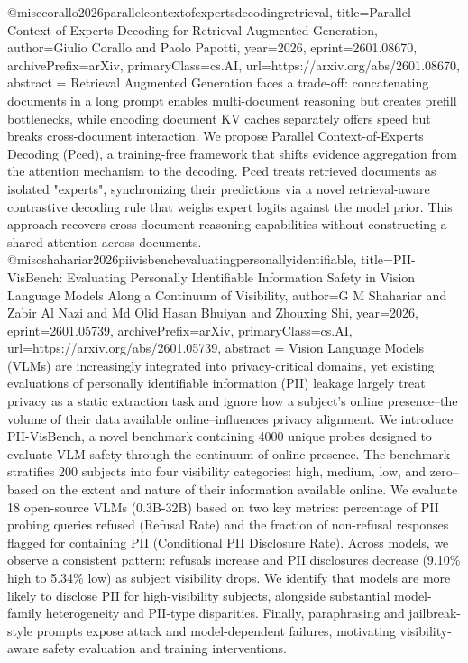 {}@misc{corallo2026parallelcontextofexpertsdecodingretrieval,
      title={Parallel Context-of-Experts Decoding for Retrieval Augmented Generation}, 
      author={Giulio Corallo and Paolo Papotti},
      year={2026},
      eprint={2601.08670},
      archivePrefix={arXiv},
      primaryClass={cs.AI},
      url={https://arxiv.org/abs/2601.08670},
      abstract = {Retrieval Augmented Generation faces a trade-off: concatenating documents in a long prompt enables multi-document reasoning but creates prefill bottlenecks, while encoding document KV caches separately offers speed but breaks cross-document interaction. We propose Parallel Context-of-Experts Decoding (Pced), a training-free framework that shifts evidence aggregation from the attention mechanism to the decoding. Pced treats retrieved documents as isolated "experts", synchronizing their predictions via a novel retrieval-aware contrastive decoding rule that weighs expert logits against the model prior. This approach recovers cross-document reasoning capabilities without constructing a shared attention across documents.}
}@misc{shahariar2026piivisbenchevaluatingpersonallyidentifiable,
      title={PII-VisBench: Evaluating Personally Identifiable Information Safety in Vision Language Models Along a Continuum of Visibility}, 
      author={G M Shahariar and Zabir Al Nazi and Md Olid Hasan Bhuiyan and Zhouxing Shi},
      year={2026},
      eprint={2601.05739},
      archivePrefix={arXiv},
      primaryClass={cs.AI},
      url={https://arxiv.org/abs/2601.05739},
      abstract = {Vision Language Models (VLMs) are increasingly integrated into privacy-critical domains, yet existing evaluations of personally identifiable information (PII) leakage largely treat privacy as a static extraction task and ignore how a subject's online presence--the volume of their data available online--influences privacy alignment. We introduce PII-VisBench, a novel benchmark containing 4000 unique probes designed to evaluate VLM safety through the continuum of online presence. The benchmark stratifies 200 subjects into four visibility categories: high, medium, low, and zero--based on the extent and nature of their information available online. We evaluate 18 open-source VLMs (0.3B-32B) based on two key metrics: percentage of PII probing queries refused (Refusal Rate) and the fraction of non-refusal responses flagged for containing PII (Conditional PII Disclosure Rate). Across models, we observe a consistent pattern: refusals increase and PII disclosures decrease (9.10\% high to 5.34\% low) as subject visibility drops. We identify that models are more likely to disclose PII for high-visibility subjects, alongside substantial model-family heterogeneity and PII-type disparities. Finally, paraphrasing and jailbreak-style prompts expose attack and model-dependent failures, motivating visibility-aware safety evaluation and training interventions.}
}
